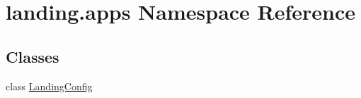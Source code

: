 \hypertarget{namespacelanding_1_1apps}{}\section{landing.\+apps Namespace Reference}
\label{namespacelanding_1_1apps}
\subsection*{Classes}
\begin{DoxyCompactItemize}
\item 
class \mbox{\hyperlink{classlanding_1_1apps_1_1LandingConfig}{Landing\+Config}}
\end{DoxyCompactItemize}
